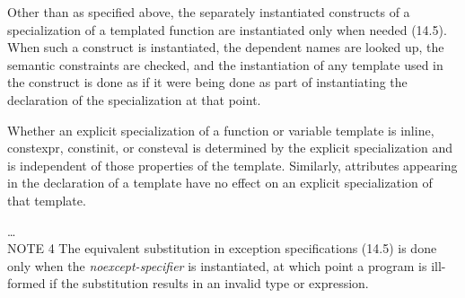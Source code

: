 \begin{modification}
Other than as specified above, the separately instantiated constructs of a
specialization of a templated function are instantiated only when needed
(14.5).  When such a construct is instantiated, the dependent
names are looked up, the semantic constraints are checked, and the
instantiation of any template used in the construct is done as if it were being
done as part of instantiating the declaration of the specialization at that
point.  
\end{modification}

\begin{modification}
Whether an explicit specialization of a function or variable template is inline,
constexpr, constinit, or consteval is determined by the explicit specialization
and is independent of those properties of the template. Similarly, attributes
 appearing in the declaration
of a template have no effect on an explicit specialization of that template.
\end{modification}

\begin{modification}
\ldots\\
NOTE 4 The equivalent substitution in exception specifications (14.5)
 is done
only when the \emph{noexcept-specifier}  is instantiated, at which point a program
is ill-formed if the substitution results in an invalid type or expression.
\end{modification}


